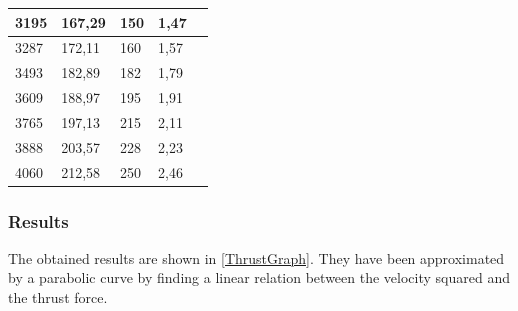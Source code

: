 \begin{table}[H]
\begin{tabular}{|l|l|l|l|p{4.3cm}|}
		\hline%
		3195 						       &  167,29				           & 150                      & 1,47         \\
		\hline%
		3287                               &  172,11   			               & 160                      & 1,57         \\
		\hline%
		3493                               &  182,89                           & 182                      & 1,79         \\
		\hline%
		3609 					           &  188,97	                       & 195                      & 1,91         \\
		\hline%
		3765 						       &  197,13		                   & 215                      & 2,11         \\
		\hline%
		3888 						       &  203,57		                   & 228                      & 2,23         \\
		\hline%
		4060 						       &  212,58		                   & 250                      & 2,46         \\
		\hline%
				
	\end{tabular}
\end{table}
\subsubsection{Results}
The obtained results are shown in \autoref{ThrustGraph}. They have been approximated by a parabolic curve by finding a linear relation between the velocity squared and the thrust force.

